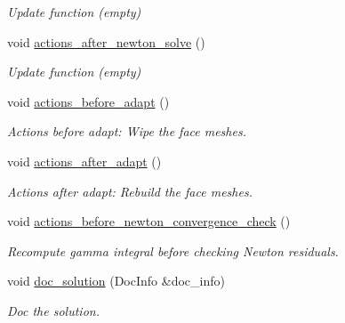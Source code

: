 \begin{DoxyCompactItemize}
\begin{DoxyCompactList}\small\item\em Update function (empty) \end{DoxyCompactList}\item 
void \hyperlink{classCoatedSphereProblem_ae5287efab54b16ec1bd5cced98971c9c}{actions\+\_\+after\+\_\+newton\+\_\+solve} ()
\begin{DoxyCompactList}\small\item\em Update function (empty) \end{DoxyCompactList}\item 
void \hyperlink{classCoatedSphereProblem_a0cd5d4eea9d34eefd829f7539c41c998}{actions\+\_\+before\+\_\+adapt} ()
\begin{DoxyCompactList}\small\item\em Actions before adapt\+: Wipe the face meshes. \end{DoxyCompactList}\item 
void \hyperlink{classCoatedSphereProblem_a77906dadd8ceb1d1d3182f298a0ca2d2}{actions\+\_\+after\+\_\+adapt} ()
\begin{DoxyCompactList}\small\item\em Actions after adapt\+: Rebuild the face meshes. \end{DoxyCompactList}\item 
void \hyperlink{classCoatedSphereProblem_a2f55bc904971ca96eb9af3451ef5b4c4}{actions\+\_\+before\+\_\+newton\+\_\+convergence\+\_\+check} ()
\begin{DoxyCompactList}\small\item\em Recompute gamma integral before checking Newton residuals. \end{DoxyCompactList}\item 
void \hyperlink{classCoatedSphereProblem_aaeade2a110160c002b2b45954a5a0edc}{doc\+\_\+solution} (Doc\+Info \&doc\+\_\+info)
\begin{DoxyCompactList}\small\item\em Doc the solution. \end{DoxyCompactList}\end{DoxyCompactItemize}
